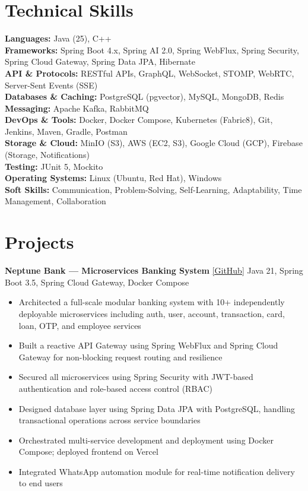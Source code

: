 \documentclass[a4paper,10pt]{article}
\begin{document}
\section{Technical Skills}
{\small\color{bodyText}
\textbf{Languages:} Java (25), C++ \\[0.3em]
\textbf{Frameworks:} Spring Boot 4.x, Spring AI 2.0, Spring WebFlux, Spring Security, Spring Cloud Gateway, Spring Data JPA, Hibernate \\[0.3em]
\textbf{API \& Protocols:} RESTful APIs, GraphQL, WebSocket, STOMP, WebRTC, Server-Sent Events (SSE) \\[0.3em]
\textbf{Databases \& Caching:} PostgreSQL (pgvector), MySQL, MongoDB, Redis \\[0.3em]
\textbf{Messaging:} Apache Kafka, RabbitMQ \\[0.3em]
\textbf{DevOps \& Tools:} Docker, Docker Compose, Kubernetes (Fabric8), Git, Jenkins, Maven, Gradle, Postman \\[0.3em]
\textbf{Storage \& Cloud:} MinIO (S3), AWS (EC2, S3), Google Cloud (GCP), Firebase (Storage, Notifications) \\[0.3em]
\textbf{Testing:} JUnit 5, Mockito \\[0.3em]
\textbf{Operating Systems:} Linux (Ubuntu, Red Hat), Windows \\[0.3em]
\textbf{Soft Skills:} Communication, Problem-Solving, Self-Learning, Adaptability, Time Management, Collaboration
}

\section{Projects}

{\small\color{bodyText}
\textbf{Neptune Bank --- Microservices Banking System} \href{https://github.com/ubinox-pi/Banking-System}{\textcolor{linkBlue}{[GitHub]}} \hfill {\footnotesize\textcolor{techGray}{Java 21, Spring Boot 3.5, Spring Cloud Gateway, Docker Compose}}
\begin{itemize}[leftmargin=1.2em, topsep=2pt, itemsep=0pt, parsep=0pt]
    \item Architected a full-scale modular banking system with 10+ independently deployable microservices including auth, user, account, transaction, card, loan, OTP, and employee services
    \item Built a reactive API Gateway using Spring WebFlux and Spring Cloud Gateway for non-blocking request routing and resilience
    \item Secured all microservices using Spring Security with JWT-based authentication and role-based access control (RBAC)
    \item Designed database layer using Spring Data JPA with PostgreSQL, handling transactional operations across service boundaries
    \item Orchestrated multi-service development and deployment using Docker Compose; deployed frontend on Vercel
    \item Integrated WhatsApp automation module for real-time notification delivery to end users
\end{itemize}
}
\end{document}
